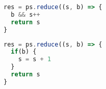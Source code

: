 \begin{figure*}[thb]
\noindent\begin{minipage}{.48\textwidth}  
\begin{lstlisting}[language=JavaScript]
res = ps.reduce((s, b) => {
  b && s++
  return s
}
\end{lstlisting}
\end{minipage}\hfill
\begin{minipage}{.48\textwidth}
\begin{lstlisting}[language=JavaScript]
res = ps.reduce((s, b) => {
  if(b) {
    s = s + 1
  }
  return s
}
\end{lstlisting}
\end{minipage}
\label{fig:lst01}
\end{figure*}


